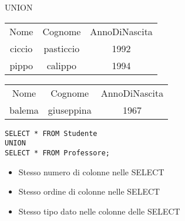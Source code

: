 \begin{frame}{UNION}
\begin{table}[h]
\centering
\begin{minipage}{.45\textwidth}
\centering
\begin{tabular}{|c|c|c|}
\hline
\rowcolor{cyan!30} \multicolumn{3}{|c|}{Studente} \\
\hline
\rowcolor{cyan!30} Nome  & Cognome & AnnoDiNascita \\
\hline
ciccio  & pasticcio & 1992 \\
pippo  & calippo & 1994 \\

\hline
\end{tabular}
\end{minipage}%
\begin{minipage}{.45\textwidth}
\centering
\begin{tabular}{|c|c|c|}
\hline
\rowcolor{cyan!30} \multicolumn{3}{|c|}{Professore} \\
\hline
\rowcolor{cyan!30} Nome  & Cognome & AnnoDiNascita \\
\hline
balema & giuseppina & 1967 \\

\hline
\end{tabular}
\end{minipage}
\end{table}
\vspace{2em}
\texttt{SELECT * FROM Studente\\UNION\\SELECT * FROM Professore;}
\begin{itemize}
    \item Stesso numero di colonne nelle SELECT
    \item Stesso ordine di colonne nelle SELECT
    \item Stesso tipo dato nelle colonne delle SELECT
\end{itemize}
\end{frame}